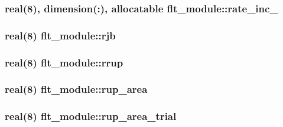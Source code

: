 \subsubsection[{rate\+\_\+inc\+\_\+0}]{\setlength{\rightskip}{0pt plus 5cm}real(8), dimension(\+:), allocatable flt\+\_\+module\+::rate\+\_\+inc\+\_}\label{namespaceflt__module_a3aa16b477093fff931adc3d47efb4391}
\hypertarget{namespaceflt__module_a61bb108f64be27cd6e6b621bd0d2be66}{}
\subsubsection[{rjb}]{\setlength{\rightskip}{0pt plus 5cm}real(8) flt\+\_\+module\+::rjb}\label{namespaceflt__module_a61bb108f64be27cd6e6b621bd0d2be66}
\hypertarget{namespaceflt__module_aacc666d4125c94c8ff0b54e1a6fac18b}{}
\subsubsection[{rrup}]{\setlength{\rightskip}{0pt plus 5cm}real(8) flt\+\_\+module\+::rrup}\label{namespaceflt__module_aacc666d4125c94c8ff0b54e1a6fac18b}
\hypertarget{namespaceflt__module_aec90f89a37148a6fe2fa52df737b51ef}{}
\subsubsection[{rup\+\_\+area}]{\setlength{\rightskip}{0pt plus 5cm}real(8) flt\+\_\+module\+::rup\+\_\+area}\label{namespaceflt__module_aec90f89a37148a6fe2fa52df737b51ef}
\hypertarget{namespaceflt__module_af824d404f5d8ef8f21222c648b493389}{}
\subsubsection[{rup\+\_\+area\+\_\+trial}]{\setlength{\rightskip}{0pt plus 5cm}real(8) flt\+\_\+module\+::rup\+\_\+area\+\_\+trial}\label{namespaceflt__module_af824d404f5d8ef8f21222c648b493389}
\hypertarget{namespaceflt__module_afbf76baeddad45d761cc805c838b369a}{}
